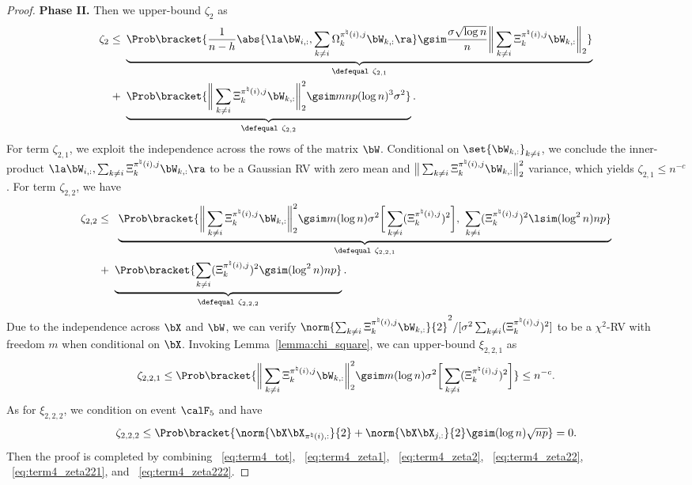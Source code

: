 \documentclass[11pt]{article}
\begin{document}
\begin{proof}
\vspace{0.1in}\noindent
\textbf{Phase II.}
Then we upper-bound $\zeta_2$ as
\begin{align}
\label{eq:term4_zeta2}
\zeta_{2}\leq~&
\underbrace{\Prob\bracket{
\frac{1}{n-h}\abs{\la \bW_{i, :}, \sum_{k\neq i} \Omega^{\pi^{\natural}(i), j}_{k}
\bW_{k, :}\ra} \gsim \frac{\sigma\sqrt{\log n}}{n} \bigg\|\sum_{k\neq i} \Xi^{\pi^{\natural}(i), j}_{k}
\bW_{k, :}\bigg\|_{2}}}_{\defequal~\zeta_{2, 1}} \notag \\
+~& \underbrace{\Prob\bracket{\bigg\|\sum_{k\neq i} \Xi^{\pi^{\natural}(i), j}_{k}
\bW_{k, :}\bigg\|_{2}^2\gsim mnp(\log n)^3 \sigma^2}}_{\defequal~\zeta_{2,2}}.
\end{align}
For term $\zeta_{2, 1}$, we exploit the independence across
the rows of the matrix $\bW$.
Conditional on $\set{\bW_{k, :}}_{k\neq i}$, we conclude
the inner-product $\la \bW_{i, :}, \sum_{k\neq i} \Xi^{\pi^{\natural}(i), j}_{k}
\bW_{k, :}\ra$ to be a Gaussian RV with zero mean and
$\big\|\sum_{k\neq i} \Xi^{\pi^{\natural}(i), j}_{k}
\bW_{k, :}\big\|_{2}^2$ variance, which yields
$\zeta_{2,1} \leq n^{-c}$.
For term $\zeta_{2, 2}$, we have
\begin{align}
\label{eq:term4_zeta22}
\zeta_{2, 2}
\leq~& \
\underbrace{\Prob\bracket{\bigg\|\sum_{k\neq i} \Xi^{\pi^{\natural}(i), j}_{k}
\bW_{k, :}\bigg\|_{2}^2\gsim m(\log n) \sigma^2\bigg[\sum_{k\neq i} (\Xi^{\pi^{\natural}(i), j}_{k})^2\bigg],~\sum_{k\neq i} (\Xi^{\pi^{\natural}(i), j}_{k})^2 \lsim (\log^2 n) np}}_{\defequal~ \zeta_{2, 2,1} } \notag \\
+ ~&\underbrace{\Prob\bracket{\sum_{k\neq i} (\Xi^{\pi^{\natural}(i), j}_{k})^2 \gsim
(\log^2 n) np}}_{\defequal~\zeta_{2,2,2}}.
\end{align}
Due to the independence across $\bX$ and $\bW$,
we can verify $\norm{\sum_{k\neq i} \Xi^{\pi^{\natural}(i), j}_{k}
\bW_{k, :}}{2}^2/[\sigma^2\sum_{k\neq i} (\Xi^{\pi^{\natural}(i), j}_{k})^2]$
to be a $\chi^2$-RV with freedom $m$ when conditional on $\bX$.
Invoking Lemma~\ref{lemma:chi_square}, we can upper-bound $\xi_{2,2,1}$ as
\begin{align}
\label{eq:term4_zeta221}
\zeta_{2, 2, 1} \leq
\Prob\bracket{\bigg\|\sum_{k\neq i} \Xi^{\pi^{\natural}(i), j}_{k}
\bW_{k, :}\bigg\|_{2}^2\gsim m(\log n) \sigma^2\bigg[\sum_{k\neq i} (\Xi^{\pi^{\natural}(i), j}_{k})^2\bigg]} \leq n^{-c}.
\end{align}
As for $\xi_{2,2,2 }$, we condition on event $\calF_5$ and have
\begin{align}
\label{eq:term4_zeta222}
\zeta_{2, 2, 2} \leq \Prob\bracket{\norm{\bX \bX_{\pi^{\natural}(i), :}}{2} + \norm{\bX \bX_{j, :}}{2} \gsim (\log n)\sqrt{np}} = 0.
\end{align}
Then the proof is completed by combining
~\eqref{eq:term4_tot}, ~\eqref{eq:term4_zeta1},
~\eqref{eq:term4_zeta2}, ~\eqref{eq:term4_zeta22},
~\eqref{eq:term4_zeta221}, and ~\eqref{eq:term4_zeta222}.
\end{proof}
\end{document}
